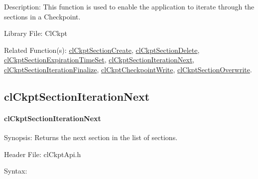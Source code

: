 \begin{flushleft}
\begin{Desc}
\begin{description}
\end{description}
\end{Desc}
\begin{Desc}
\item[Description:]This function is used to enable the application to iterate through the sections in a Checkpoint.\end{Desc}
\begin{Desc}
\item[Library File:]Cl\-Ckpt\end{Desc}
\begin{Desc}
\item[Related Function(s):]\hyperlink{pageckpt110}{cl\-Ckpt\-Section\-Create}, \hyperlink{pageckpt111}{cl\-Ckpt\-Section\-Delete}, 
\hyperlink{pageckpt112}{cl\-Ckpt\-Section\-Expiration\-Time\-Set}, \hyperlink{pageckpt114}{cl\-Ckpt\-Section\-Iteration\-Next}, 
\hyperlink{pageckpt115}{cl\-Ckpt\-Section\-Iteration\-Finalize}, \hyperlink{pageckpt116}{cl\-Ckpt\-Checkpoint\-Write}, 
\hyperlink{pageckpt117}{cl\-Ckpt\-Section\-Overwrite}. \end{Desc}
\newpage


\subsection{clCkptSectionIterationNext} 
\hypertarget{pageckpt114}{}\paragraph{cl\-Ckpt\-Section\-Iteration\-Next}\label{pageckpt114}
\begin{Desc}
\item[Synopsis:]Returns the next section in the list of sections.\end{Desc}
\begin{Desc}
\item[Header File:]clCkptApi.h\end{Desc}
\begin{Desc}
\item[Syntax:]


\end{Desc}
\end{flushleft}
